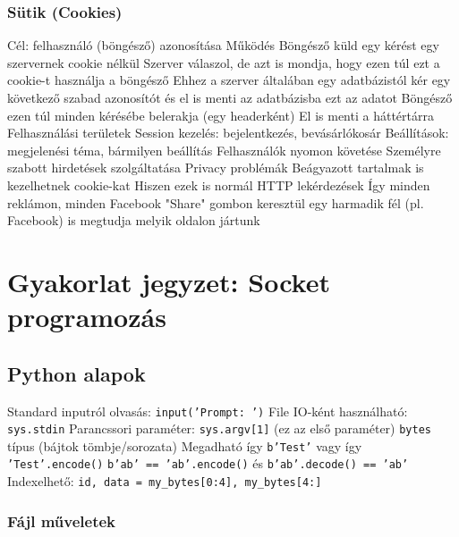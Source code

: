 \documentclass[12pt,a4paper]{article}
\begin{document}
\pagebreak

\subsubsection{Sütik (Cookies)}

\begin{outline}
	\1 Cél: felhasználó (böngésző) azonosítása
	\1 Működés
		\2 Böngésző küld egy kérést egy szervernek cookie nélkül
		\2 Szerver válaszol, de azt is mondja, hogy ezen túl ezt a cookie-t használja a böngésző
			\3 Ehhez a szerver általában egy adatbázistól kér egy következő szabad azonosítót és el is menti az adatbázisba ezt az adatot
		\2 Böngésző ezen túl minden kérésébe belerakja (egy headerként)
			\3 El is menti a háttértárra
	\1 Felhasználási területek
		\2 Session kezelés: bejelentkezés, bevásárlókosár
		\2 Beállítások: megjelenési téma, bármilyen beállítás
		\2 Felhasználók nyomon követése
		\2 Személyre szabott hirdetések szolgáltatása
	\1 Privacy problémák
		\2 Beágyazott tartalmak is kezelhetnek cookie-kat
			\3 Hiszen ezek is normál HTTP lekérdezések
		\2 Így minden reklámon, minden Facebook "Share" gombon keresztül egy harmadik fél (pl. Facebook) is megtudja melyik oldalon jártunk
\end{outline}

\pagebreak

\section{Gyakorlat jegyzet: Socket programozás}

\subsection{Python alapok}

\begin{outline}
	\1 Standard inputról olvasás: \texttt{input('Prompt: ')}
		\2 File IO-ként használható: \texttt{sys.stdin}
	\1 Parancssori paraméter: \texttt{sys.argv[1]} (ez az első paraméter)
	\1 \texttt{bytes} típus (bájtok tömbje/sorozata)
		\2 Megadható így \texttt{b'Test'} vagy így \texttt{'Test'.encode()}
		\2 \texttt{b'ab' == 'ab'.encode()} és \texttt{b'ab'.decode() == 'ab'}
		\2 Indexelhető: \texttt{id, data = my\_bytes[0:4], my\_bytes[4:]}
\end{outline}

\subsubsection{Fájl műveletek}
\end{document}

